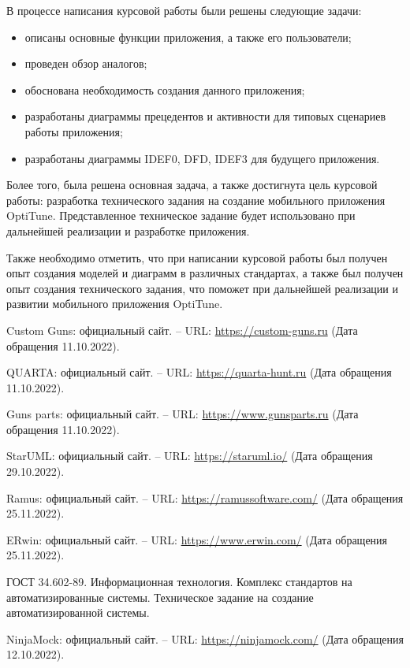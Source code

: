 \documentclass[14pt]{extreport}
\begin{document}
\conclusions

В процессе написания курсовой работы были решены следующие задачи:
\begin{itemize}
	\item описаны основные функции приложения, а также его пользователи;
	\item проведен обзор аналогов;
	\item обоснована необходимость создания данного приложения;
	\item разработаны диаграммы прецедентов и активности для типовых сценариев работы приложения;
	\item разработаны диаграммы IDEF0, DFD, IDEF3 для будущего приложения.
\end{itemize}

Более того, была решена основная задача, а также достигнута цель курсовой работы: разработка технического задания на создание мобильного приложения OptiTune. Представленное техническое задание будет использовано при дальнейшей реализации и разработке приложения. 

Также необходимо отметить, что при написании курсовой работы был получен опыт создания моделей и диаграмм в различных стандартах, а также был получен опыт создания технического задания, что поможет при дальнейшей реализации и развитии мобильного приложения OptiTune.


\newpage
\begin{thebibliography}{99}

 Custom Guns: официальный сайт. – URL: \url{https://custom-guns.ru} (Дата обращения 11.10.2022).

 QUARTA: официальный сайт. – URL: \url{https://quarta-hunt.ru} (Дата обращения 11.10.2022).

 Guns parts: официальный сайт. – URL: \url{https://www.gunsparts.ru} (Дата обращения 11.10.2022).

 StarUML: официальный сайт. – URL: \url{https://staruml.io/} (Дата обращения 29.10.2022).

 Ramus: официальный сайт. – URL: \url{https://ramussoftware.com/} (Дата обращения 25.11.2022).

 ERwin: официальный сайт. – URL: \url{https://www.erwin.com/} (Дата обращения 25.11.2022).

 ГОСТ 34.602-89. Информационная технология. Комплекс стандартов на автоматизированные системы. Техническое задание на создание автоматизированной системы.

 NinjaMock: официальный сайт. – URL: \url{https://ninjamock.com/} (Дата обращения 12.10.2022).

\end{thebibliography}
\end{document}
